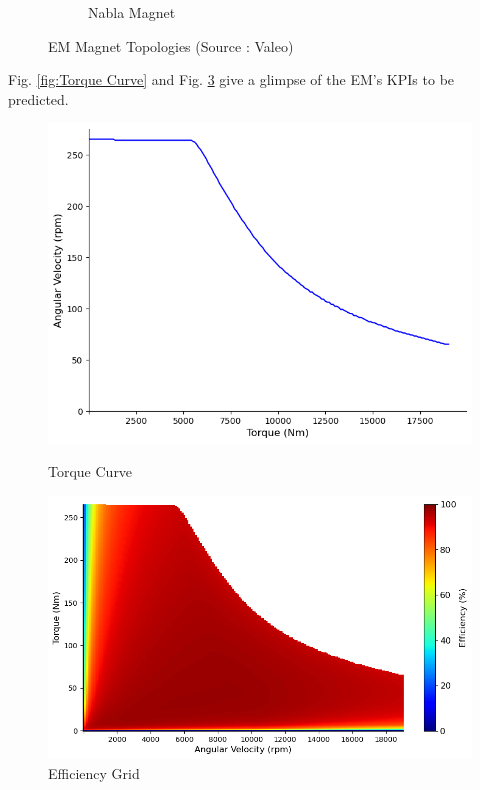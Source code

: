\documentclass{report} %
\begin{document}
\begin{figure}[H]
\begin{subfigure}{0.32\textwidth}
        \caption{Nabla Magnet}
        \label{fig:Nabla Magnet}
    \end{subfigure}
    \caption{\ac{EM} Magnet Topologies (Source : Valeo)}
    \label{fig:EM Magnet Topologies}
\end{figure}

Fig. \ref{fig:Torque Curve} and Fig. \ref{fig:Efficiency Grid} give a glimpse of the \ac{EM}'s \ac{KPI}s to be predicted.
\begin{figure}[H]
    \centering
    \begin{minipage}[b]{0.44\textwidth}
        \centering
        \includegraphics[width=\textwidth]{./ReportImages/TorqueCurve.png}
        \caption{Torque Curve} %
        \label{fig:Torque Curve}
    \end{minipage}
    \hfill
    \begin{minipage}[b]{0.54\textwidth}
        \centering
        \includegraphics[width=\textwidth]{./ReportImages/EfficiencyGrid.png}
        \caption{Efficiency Grid}
        \label{fig:Efficiency Grid}
    \end{minipage}
\end{figure}
\end{document}
